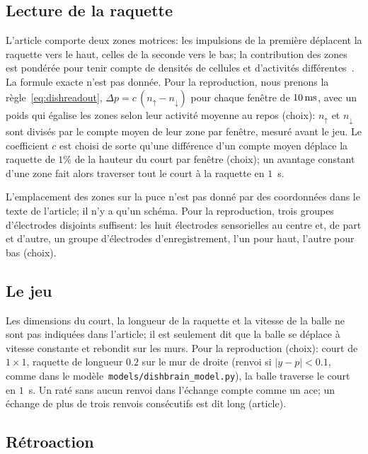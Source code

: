 \subsection*{Lecture de la raquette}

L'article comporte deux zones motrices: les impulsions de la première déplacent la raquette vers le haut, celles de la seconde vers le bas; la contribution des zones est pondérée pour tenir compte de densités de cellules et d'activités différentes~\cite{Kagan2022}. La formule exacte n'est pas donnée. Pour la reproduction, nous prenons la règle~\eqref{eq:dishreadout}, $\Delta p=c\,(n_\uparrow-n_\downarrow)$ pour chaque fenêtre de $10\,\text{ms}$, avec un poids qui égalise les zones selon leur activité moyenne au repos (choix): $n_\uparrow$ et $n_\downarrow$ sont divisés par le compte moyen de leur zone par fenêtre, mesuré avant le jeu. Le coefficient $c$ est choisi de sorte qu'une différence d'un compte moyen déplace la raquette de $1\%$ de la hauteur du court par fenêtre (choix); un avantage constant d'une zone fait alors traverser tout le court à la raquette en $1$~s.

L'emplacement des zones sur la puce n'est pas donné par des coordonnées dans le texte de l'article; il n'y a qu'un schéma. Pour la reproduction, trois groupes d'électrodes disjoints suffisent: les huit électrodes sensorielles au centre et, de part et d'autre, un groupe d'électrodes d'enregistrement, l'un pour \og haut\fg{}, l'autre pour \og bas\fg{} (choix).

\subsection*{Le jeu}

Les dimensions du court, la longueur de la raquette et la vitesse de la balle ne sont pas indiquées dans l'article; il est seulement dit que la balle se déplace à vitesse constante et rebondit sur les murs. Pour la reproduction (choix): court de $1\times1$, raquette de longueur $0.2$ sur le mur de droite (renvoi si $|y-p|<0.1$, comme dans le modèle~\texttt{models/dishbrain\_model.py}), la balle traverse le court en $1$~s. Un raté sans aucun renvoi dans l'échange compte comme un \og ace\fg{}; un échange de plus de trois renvois consécutifs est dit \og long\fg{} (article).

\subsection*{Rétroaction}

